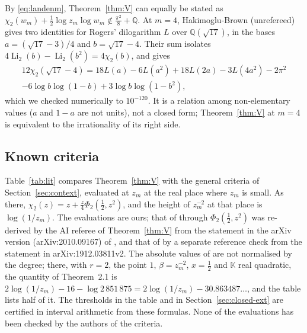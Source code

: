 \documentclass[11pt]{amsart}
\theoremstyle{definition}
\theoremstyle{remark}
\numberwithin{equation}{section}
\newcommand{\QQ}{\mathbb{Q}}
\newcommand{\KK}{\mathbb{K}}
\newcommand{\Li}{\operatorname{Li}}
\begin{document}
By \eqref{eq:landenm}, Theorem~\ref{thm:V} can equally be stated as
$\chi_2(w_m)+\frac12\log z_m\log w_m\notin\frac{\pi^2}8+\QQ$. At $m=4$, Hakimoglu-Brown \cite[Cor.~14]{HakimogluBrown2026}
(unrefereed) gives two identities for Rogers' dilogarithm $L$ over $\QQ(\sqrt{17})$, in the bases $a=(\sqrt{17}-3)/4$
and $b=\sqrt{17}-4$. Their sum isolates $4\Li_2(b)-\Li_2(b^2)=4\chi_2(b)$, and gives
\begin{multline*}
  12\chi_2(\sqrt{17}-4)=18L(a)-6L(a^2)+18L(2a)-3L(4a^2)-2\pi^2\\
  -6\log b\log(1-b)+3\log b\log(1-b^2),
\end{multline*}
which we checked numerically to $10^{-120}$. It is a relation among non-elementary values ($a$ and $1-a$ are not units),
not a closed form; Theorem~\ref{thm:V} at $m=4$ is equivalent to the irrationality of its right side.

\subsection{Known criteria}\label{sec:lit}
Table~\ref{tab:lit} compares Theorem~\ref{thm:V} with the general criteria of Section~\ref{sec:context}, evaluated at
$z_m$ at the real place where $z_m$ is small. As there, $\chi_2(z)=z+\frac z4\Phi_2(\frac12,z^2)$, and the height of
$z_m^{-2}$ at that place is $\log(1/z_m)$. The evaluations are ours; that of \cite[Thm.~1]{DHK2022b} through
$\Phi_2(\frac12,z^2)$ was re-derived by the AI referee of Theorem~\ref{thm:V} from the statement in the arXiv version
(arXiv:2010.09167) of \cite{DHK2022b}, and that of \cite[Thm.~2.1]{DHK2020} by a separate reference check from the
statement in arXiv:1912.03811v2. The absolute values of \cite{DHK2020} are not normalised by the degree; there, with
$r=2$, the point $1$, $\beta=z_m^{-2}$, $x=\frac12$ and $\KK$ real quadratic, the quantity of Theorem~2.1 is
$2\log(1/z_m)-16-\log2\,851\,875=2\log(1/z_m)-30.863487\ldots$, and the table lists half of it. The thresholds in the
table and in Section~\ref{sec:closed-ext} are certified in interval arithmetic from these formulas. None of the
evaluations has been checked by the authors of the criteria.
\end{document}
